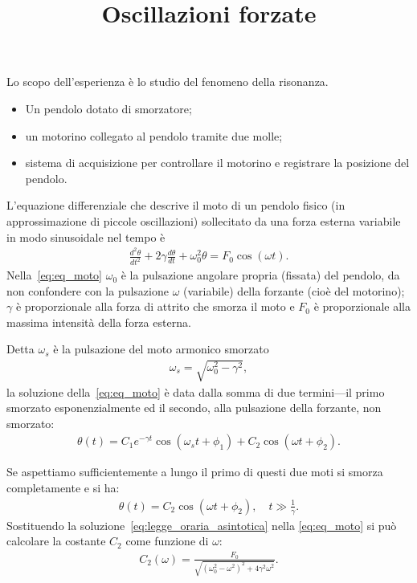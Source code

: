 \documentclass{lab1-article}
\title{Oscillazioni forzate}
\begin{document}
\begin{article}

\maketitle

\secsummary

Lo scopo dell'esperienza \`e lo studio del fenomeno della risonanza.

\secmaterials

\begin{itemize}
\item Un pendolo dotato di smorzatore;
\item un motorino collegato al pendolo tramite due molle;
\item sistema di acquisizione per controllare il motorino e registrare la
  posizione del pendolo.
\end{itemize}


\secmeasurements

L'equazione differenziale che descrive il moto di un pendolo fisico
(in approssimazione di piccole oscillazioni) sollecitato
da una forza esterna variabile in modo sinusoidale nel tempo \`e
\begin{align}\label{eq:eq_moto}
  \frac{d^2\theta}{dt^2} + 2\gamma\frac{d\theta}{dt} + \omega_0^2\theta = 
  F_0 \cos(\omega t).
\end{align}
Nella~\eqref{eq:eq_moto} $\omega_0$ \`e la pulsazione angolare propria
(fissata) del pendolo, da non confondere con la pulsazione $\omega$ (variabile)
della forzante (cio\`e del motorino); $\gamma$ \`e proporzionale alla
forza di attrito che smorza il moto e $F_0$ \`e proporzionale alla massima
intensit\`a della forza esterna.

Detta $\omega_s$ \`e la pulsazione del moto armonico smorzato
\begin{align}
  \omega_s = \sqrt{\omega_0^2 - \gamma^2},
\end{align}
la soluzione della~\eqref{eq:eq_moto} \`e data dalla somma
di due termini---il primo smorzato esponenzialmente ed il secondo, alla
pulsazione della forzante, non smorzato:
\begin{align}
  \theta(t) = C_1 e^{-\gamma t} \cos( \omega_s t + \phi_1) + 
  C_2 \cos(\omega t + \phi_2).
\end{align}

Se aspettiamo sufficientemente a lungo il primo di questi due moti si smorza
completamente e si ha:
\begin{align}\label{eq:legge_oraria_asintotica}
  \theta(t) = C_2 \cos(\omega t + \phi_2), \quad t \gg \frac{1}{\gamma}.
\end{align}
Sostituendo la soluzione~\eqref{eq:legge_oraria_asintotica} nella
\eqref{eq:eq_moto} si pu\`o calcolare la costante $C_2$ come funzione di
$\omega$:
\begin{align}\label{eq:curva_risonanza}
  C_2(\omega) = \frac{F_0}{\sqrt{(\omega_0^2 - \omega^2)^2 + 4\gamma^2\omega^2}}.
\end{align}



\end{article}
\end{document}
